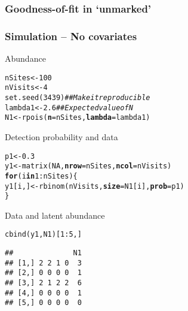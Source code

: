 \documentclass[color=usenames,dvipsnames]{beamer}\usepackage[]{graphicx}\usepackage[]{color}
\makeatletter
\newcommand{\hlnum}[1]{\textcolor[rgb]{0.69,0.494,0}{#1}}%
\newcommand{\hlcom}[1]{\textcolor[rgb]{0.514,0.506,0.514}{\textit{#1}}}%
\newcommand{\hlopt}[1]{\textcolor[rgb]{0,0,0}{#1}}%
\newcommand{\hlstd}[1]{\textcolor[rgb]{0,0,0}{#1}}%
\newcommand{\hlkwa}[1]{\textcolor[rgb]{0,0,0}{\textbf{#1}}}%
\newcommand{\hlkwb}[1]{\textcolor[rgb]{0,0.341,0.682}{#1}}%
\newcommand{\hlkwc}[1]{\textcolor[rgb]{0,0,0}{\textbf{#1}}}%
\newcommand{\hlkwd}[1]{\textcolor[rgb]{0.004,0.004,0.506}{#1}}%
\newenvironment{kframe}{%
 \def\at@end@of@kframe{}%
 \ifinner\ifhmode%
  \def\at@end@of@kframe{\end{minipage}}%
  \begin{minipage}{\columnwidth}%
 \fi\fi%
 \def\FrameCommand##1{\hskip\@totalleftmargin \hskip-\fboxsep
 \colorbox{shadecolor}{##1}\hskip-\fboxsep
     \hskip-\linewidth \hskip-\@totalleftmargin \hskip\columnwidth}%
 \MakeFramed {\advance\hsize-\width
   \@totalleftmargin\z@ \linewidth\hsize
   \@setminipage}}%
 {\par\unskip\endMakeFramed%
 \at@end@of@kframe}
\newenvironment{knitrout}{}{} %
\makeatother
\begin{document}
\begin{frame}[fragile]
  \frametitle{Goodness-of-fit in `unmarked'}
  
\end{frame}






\begin{frame}[fragile]
  \frametitle{Simulation -- No covariates}
  \small
  Abundance
\begin{knitrout}\scriptsize
{}\color{fgcolor}\begin{kframe}
\begin{alltt}
\hlstd{nSites} \hlkwb{<-} \hlnum{100}
\hlstd{nVisits} \hlkwb{<-} \hlnum{4}
\hlkwd{set.seed}\hlstd{(}\hlnum{3439}\hlstd{)}  \hlcom{## Make it reproducible}
\hlstd{lambda1} \hlkwb{<-} \hlnum{2.6}  \hlcom{## Expected value of N}
\hlstd{N1} \hlkwb{<-} \hlkwd{rpois}\hlstd{(}\hlkwc{n}\hlstd{=nSites,} \hlkwc{lambda}\hlstd{=lambda1)}
\end{alltt}
\end{kframe}
\end{knitrout}
  \pause
  \vfill
  Detection probability and data
\begin{knitrout}\scriptsize
{}\color{fgcolor}\begin{kframe}
\begin{alltt}
\hlstd{p1} \hlkwb{<-} \hlnum{0.3}
\hlstd{y1} \hlkwb{<-} \hlkwd{matrix}\hlstd{(}\hlnum{NA}\hlstd{,} \hlkwc{nrow}\hlstd{=nSites,} \hlkwc{ncol}\hlstd{=nVisits)}
\hlkwa{for}\hlstd{(i} \hlkwa{in} \hlnum{1}\hlopt{:}\hlstd{nSites) \{}
    \hlstd{y1[i,]} \hlkwb{<-} \hlkwd{rbinom}\hlstd{(nVisits,} \hlkwc{size}\hlstd{=N1[i],} \hlkwc{prob}\hlstd{=p1)}
\hlstd{\}}
\end{alltt}
\end{kframe}
\end{knitrout}
  \pause
  \vfill
  Data and latent abundance
\begin{knitrout}\scriptsize
{}\color{fgcolor}\begin{kframe}
\begin{alltt}
\hlkwd{cbind}\hlstd{(y1, N1)[}\hlnum{1}\hlopt{:}\hlnum{5}\hlstd{,]}
\end{alltt}
\begin{verbatim}
##              N1
## [1,] 2 2 1 0  3
## [2,] 0 0 0 0  1
## [3,] 2 1 2 2  6
## [4,] 0 0 0 0  1
## [5,] 0 0 0 0  0
\end{verbatim}
\end{kframe}
\end{knitrout}
\end{frame}
\end{document}
